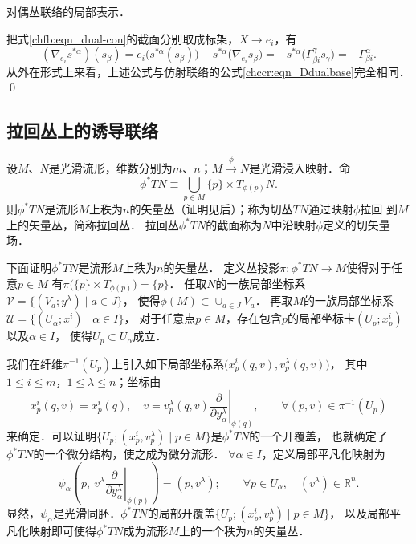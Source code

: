 \begin{example}
    对偶丛联络的局部表示．
\end{example}
把式\eqref{chfb:eqn_dual-con}的截面分别取成标架，$X\to {e_i}$，有
\begin{equation}\label{chfb:eqn_Dssg}
    (\nabla_{e_i} s^{*\alpha} )(s_\beta)= {e_i} \bigl(s^{*\alpha}(s_\beta)\bigr)
    -s^{*\alpha} \bigl(\nabla_{e_i} s_\beta\bigr)
    =-s^{*\alpha} \bigl( \Gamma_{\beta i}^\gamma s_\gamma \bigr)
    =-\Gamma_{\beta i}^\alpha .
\end{equation}
从外在形式上来看，上述公式与仿射联络的公式\eqref{chccr:eqn_Ddualbase}完全相同． 
\qed

 

\subsection{拉回丛上的诱导联络}\label{chfb:sec_pull-back-bundle}

设$M$、$N$是光滑流形，维数分别为$m$、$n$；$M \xrightarrow{\phi} N$是光滑浸入映射．命
\begin{equation}\label{chfb:eqn_pull-back-bundle}
    \phi^* TN \equiv \bigcup_{p \in M} \{p\}\times T_{\phi(p)} N .
\end{equation}
则$\phi^* TN$是流形$M$上秩为$n$的矢量丛（证明见后）；称为切丛$TN$通过映射$\phi$拉回
到$M$上的矢量丛，简称{\heiti 拉回丛}．
拉回丛$\phi^* TN$的截面称为$N$中{\heiti 沿映射$\phi$定义的切矢量场}．

下面证明$\phi^* TN$是流形$M$上秩为$n$的矢量丛．
定义丛投影$\pi : \phi^* TN \to M$使得对于任意$p\in M$
有$\pi\bigl(\{p\}\times T_{\phi(p)} \bigr)=\{p\} $．
任取$N$的一族局部坐标系$\mathcal{V}=\{(V_a; y^\lambda)\mid a \in J\}$，
使得$\phi(M)\subset \cup_{a\in J} V_a$．
再取$M$的一族局部坐标系$\mathcal{U}=\{(U_\alpha; x^i)\mid \alpha \in I\}$，
对于任意点$p\in M$，存在包含$p$的局部坐标卡$(U_p; x^i_p)$以及$\alpha\in I$，
使得$U_p \subset U_\alpha$成立．

我们在纤维$\pi^{-1}(U_p)$上引入如下局部坐标系$\bigl(x^i_p(q,v), v^\lambda_p(q,v)\bigr)$，
其中$1\leqslant i\leqslant m$，$ 1\leqslant \lambda \leqslant n$；坐标由
\begin{equation*}
    x^i_p(q,v)=x^i_p(q),\quad
    v=v^\lambda_p(q,v)\left.\frac{\partial}{\partial y^\lambda_\alpha}\right|_{\phi(q)} ,
    \qquad \forall (p,v)\in \pi^{-1}(U_p)
\end{equation*}
来确定．可以证明$\{U_p; (x^i_p, v^\lambda_p ) \mid p\in M\}$是$\phi^*TN$的一个开覆盖，
也就确定了$\phi^*TN$的一个微分结构，使之成为微分流形．
$\forall \alpha \in I$，定义局部平凡化映射为
\begin{equation*}
    \psi_\alpha \left(p,\  v^\lambda \left.\frac{\partial}{\partial y^\lambda_\alpha}\right|_{\phi(p)} \right)
    = (p, v^\lambda); \qquad
    \forall p\in U_\alpha, \quad (v^\lambda)\in \mathbb{R}^n .
\end{equation*}
显然，$\psi_\alpha$是光滑同胚．$\phi^*TN$的局部开覆盖$\{U_p; (x^i_p, v^\lambda_p ) \mid p\in M\}$，
以及局部平凡化映射即可使得$\phi^*TN$成为流形$M$上的一个秩为$n$的矢量丛．

